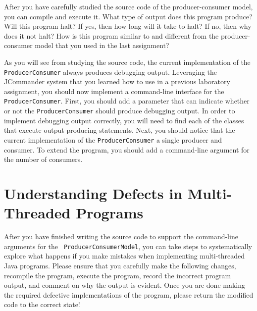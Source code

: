 After you have carefully studied the source code of the producer-consumer model, you can compile and execute it.  What
type of output does this program produce?  Will this program halt?  If yes, then how long will it take to halt?  If no,
then why does it not halt? How is this program similar to and different from the producer-consumer model that you used
in the last assignment?

As you will see from studying the source code, the current implementation of the {\tt ProducerConsumer} always produces
debugging output. Leveraging the JCommander system that you learned how to use in a previous laboratory assignment, you
should now implement a command-line interface for the {\tt ProducerConsumer}. First, you should add a parameter that can
indicate whether or not the {\tt ProducerConsumer} should produce debugging output.  In order to implement debugging
output correctly, you will need to find each of the classes that execute output-producing statements.  Next, you should
notice that the current implementation of the {\tt ProducerConsumer} a single producer and consumer.  To extend the
program, you should add a command-line argument for the number of consumers.

\section*{Understanding Defects in Multi-Threaded Programs}

After you have finished writing the source code to support the command-line arguments for the {\tt
  ProducerConsumerModel}, you can take steps to systematically explore what happens if you make mistakes when
implementing multi-threaded Java programs.  Please ensure that you carefully make the following changes, recompile the
program, execute the program, record the incorrect program output, and comment on why the output is evident.  Once you
are done making the required defective implementations of the program, please return the modified code to the correct
state!

